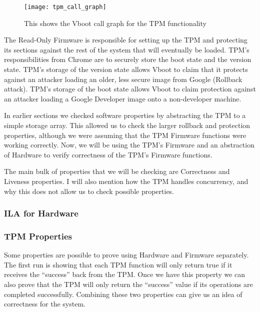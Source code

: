 \documentclass[../report.tex]{subfiles}
\begin{document}
\begin{figure}[!htbp]
  \centering
  \texttt{[image: tpm\_call\_graph]}
  \caption{This shows the Vboot call graph for the TPM functionality}\label{fig:tpm_call_graph}
\end{figure}

The Read-Only Firmware is responsible for setting up the TPM and protecting its
sections against the rest of the system that will eventually be loaded.
TPM's responsibilities from Chrome are to securely store the boot state and the
version state.
TPM's storage of the version state allows Vboot to claim that it protects against 
an attacker loading an older, less secure image from Google (Rollback attack).
TPM's storage of the boot state allows Vboot to claim protection against an attacker loading a Google Developer image onto a non-developer machine.

In earlier sections we checked software properties by abstracting the TPM to a simple storage array. 
This allowed us to check the larger rollback and protection properties, although we were assuming that the TPM Firmware functions were working correctly.
Now, we will be using the TPM's Firmware and an abstraction of Hardware to verify correctness of the TPM's Firmware functions.

The main bulk of properties that we will be checking are Correctness and Liveness properties. 
I will also mention how the TPM handles concurrency, and why this does not allow us to check possible properties.


\subsubsection{ILA for Hardware}   

\subsubsection{TPM Properties}   

Some properties are possible to prove using Hardware and Firmware separately.
The first run is showing that each TPM function will only return true if it receives the ``success'' back from the TPM\@.
Once we have this property we can also prove that the TPM will only return the ``success'' value if its operations are completed successfully. 
Combining these two properties can give us an idea of correctness for the system.
\end{document}
